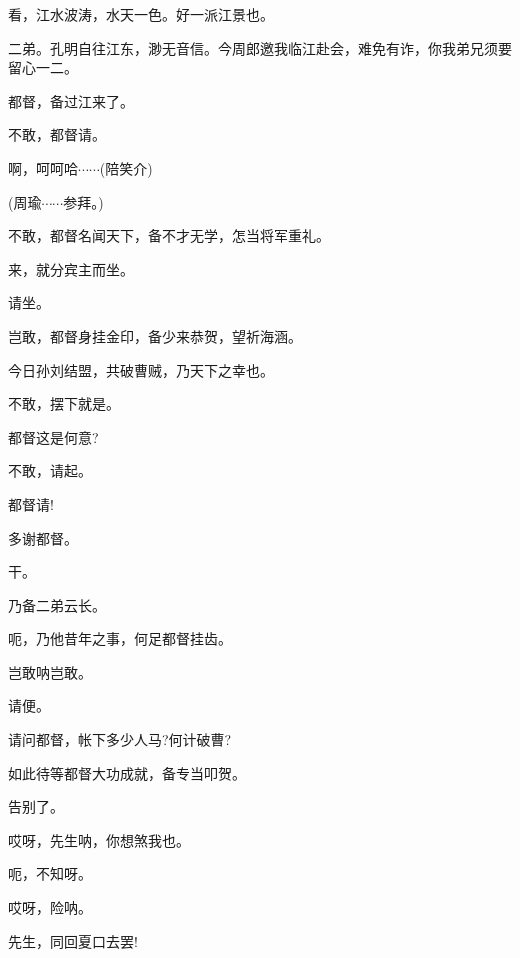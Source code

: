 {\vspace{5pt}

看，江水波涛，水天一色。好一派江景也。


二弟。孔明自往江东，渺无音信。今周郎邀我临江赴会，难免有诈，你我弟兄须要留心一二。

\vspace{5pt}

都督，备过江来了。

不敢，都督请。

啊，呵呵哈$\cdots{}\cdots{}$({\hwfs 陪笑介})

(周瑜\hspace{30pt}$\cdots{}\cdots{}$参拜。)

不敢，都督名闻天下，备不才无学，怎当将军重礼。

来，就分宾主而坐。

请坐。

岂敢，都督身挂金印，备少来恭贺，望祈海涵。

今日孙刘结盟，共破曹贼，乃天下之幸也。

不敢，摆下就是。

都督这是何意?

不敢，请起。

都督请!




多谢都督。

干。

乃备二弟云长。

呃，乃他昔年之事，何足都督挂齿。

岂敢呐岂敢。

请便。

请问都督，帐下多少人马?何计破曹?

如此待等都督大功成就，备专当叩贺。

告别了。


\vspace{5pt}


哎呀，先生呐，你想煞我也。

呃，不知呀。

哎呀，险呐。

先生，同回夏口去罢!


}
